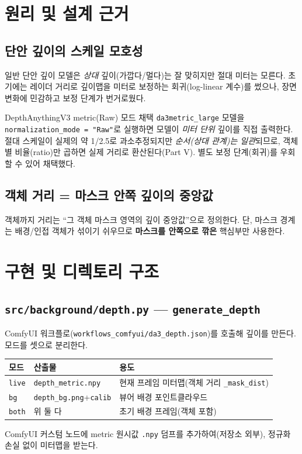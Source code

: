 \begin{statusdone}\end{statusdone}

\chapter{원리 및 설계 근거}

\section{단안 깊이의 스케일 모호성}
일반 단안 깊이 모델은 \emph{상대} 깊이(가깝다/멀다)는 잘 맞히지만 절대 미터는
모른다. 초기에는 레이더 거리로 깊이맵을 미터로 보정하는 회귀(log-linear 계수)를
썼으나, 장면 변화에 민감하고 보정 단계가 번거로웠다.

\begin{designbox}{DepthAnythingV3 metric(Raw) 모드 채택}
\texttt{da3metric\_large} 모델을 \texttt{normalization\_mode = "Raw"}로 실행하면
모델이 \emph{미터 단위} 깊이를 직접 출력한다. 절대 스케일이 실제의 약 1/2.5로
과소추정되지만 \emph{순서(상대 관계)는 일관}되므로, 객체별 비율(ratio)만 곱하면
실제 거리로 환산된다(Part V). 별도 보정 단계(회귀)를 우회할 수 있어 채택했다.
\end{designbox}

\section{객체 거리 = 마스크 안쪽 깊이의 중앙값}
객체까지 거리는 ``그 객체 마스크 영역의 깊이 중앙값''으로 정의한다. 단,
마스크 경계는 배경/인접 객체가 섞이기 쉬우므로 \textbf{마스크를 안쪽으로 깎은}
핵심부만 사용한다.

\chapter{구현 및 디렉토리 구조}

\section{\texttt{src/background/depth.py} — \texttt{generate\_depth}}
ComfyUI 워크플로(\texttt{workflows\_comfyui/da3\_depth.json})를 호출해 깊이를 만든다.
모드를 셋으로 분리한다.
\begin{center}
\begin{tabular}{@{}llp{6.5cm}@{}}
\toprule
모드 & 산출물 & 용도 \\
\midrule
\texttt{live} & \texttt{depth\_metric.npy} & 현재 프레임 미터맵(객체 거리 \texttt{\_mask\_dist}) \\
\texttt{bg}   & \texttt{depth\_bg.png}+\texttt{calib} & 뷰어 배경 포인트클라우드 \\
\texttt{both} & 위 둘 다 & 초기 배경 프레임(객체 포함) \\
\bottomrule
\end{tabular}
\end{center}
ComfyUI 커스텀 노드에 metric 원시값 \texttt{.npy} 덤프를 추가하여(저장소 외부),
정규화 손실 없이 미터맵을 받는다.

